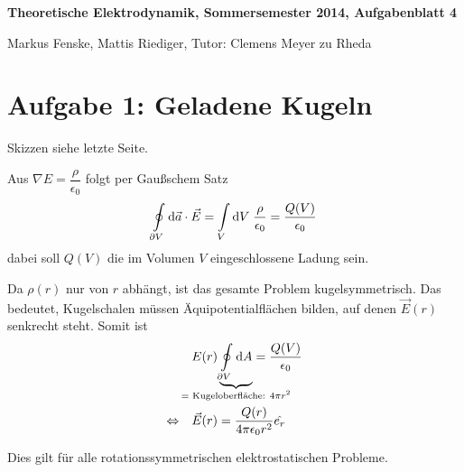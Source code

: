 \documentclass[a4paper,german,12pt,smallheadings]{scrartcl}
\begin{document}
\allowdisplaybreaks %
\begin{center}
\bfseries %
\sffamily %
\vspace{-40pt}
Theoretische Elektrodynamik, Sommersemester 2014, Aufgabenblatt 4

Markus Fenske, Mattis Riediger, Tutor: Clemens Meyer zu Rheda
\vspace{-10pt}
\end{center}

\section*{Aufgabe 1: Geladene Kugeln}
Skizzen siehe letzte Seite. %

Aus $\nabla E = \dfrac{\rho}{\epsilon_0}$ folgt per Gaußschem Satz
\begin{equation}
  \oint\limits_{\partial V} \dif \vec{a} \cdot \vec{E} = \int\limits_{V} \dif V \; \frac{\rho}{\epsilon_0} = \frac{Q(V)}{\epsilon_0}
\end{equation}
dabei soll $Q(V)$ die im Volumen $V$ eingeschlossene Ladung sein.

Da $\rho(r)$ nur von $r$ abhängt, ist das gesamte Problem kugelsymmetrisch.
Das bedeutet, Kugelschalen müssen Äquipotentialflächen bilden, auf denen
$\vec{E}(r)$ senkrecht steht. Somit ist
\begin{align}
  &E(r) \underbrace{\oint\limits_{\partial V} \dif A}_{\mathclap{= \text{ Kugeloberfläche: } 4 \pi r^2}} = \frac{Q(V)}{\epsilon_0} \\
  \Leftrightarrow\quad
  & \vec{E}(r) = \frac{Q(r)}{4 \pi \epsilon_0 r^2} \hat{e_r}
\end{align}

Dies gilt für alle rotationssymmetrischen elektrostatischen Probleme.
\end{document}
